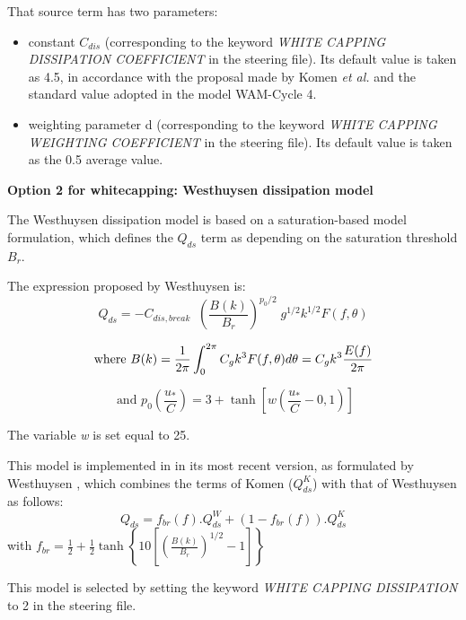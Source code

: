 That source term has two parameters:

\begin{itemize}
\item  constant $C_{dis}$ (corresponding to the keyword \textit{WHITE CAPPING DISSIPATION COEFFICIENT }in the steering file). Its default value is taken as 4.5, in accordance with the proposal made by Komen \textit{et al.} \cite{Komen1984} and the standard value adopted in the model WAM-Cycle 4.
\item  weighting parameter d (corresponding to the keyword \textit{WHITE CAPPING WEIGHTING COEFFICIENT} in the steering file). Its default value is taken as the 0.5 average value.
\end{itemize}

{\bf  Option 2 for whitecapping: Westhuysen dissipation model}

 The Westhuysen dissipation model \cite{Westhuys2007} is based on a saturation-based model formulation, which defines the ${Q}_{ds}$ term as depending on the saturation threshold ${B}_{r}$.

 The expression proposed by Westhuysen is:
\begin{equation} \label{GrindEQ__4_40_}
Q_{ds} =-C_{dis,break} \; \; \left(\frac{B(k)}{B_{r} } \right)^{p_{0} /2} \; g^{1/2} k^{1/2} F(f,\theta )
\end{equation}

$$\mbox{where }\displaystyle B(k)=\frac{1}{2\pi } \int _{0}^{2\pi }C_{g} k^{3} F(f,\theta )d\theta  =C_{g} k^{3} \frac{E(f)}{2\pi } $$

$$\mbox{ and }p_{0} \left(\frac{u_{*} }{C} \right)=3+\tanh \left[w\left(\frac{u_{*} }{C} -0,1\right)\right]$$

 The variable \textit{w} is set equal to 25.

 This model is implemented in \tomawac in its most recent version, as formulated by Westhuysen \cite{Westhuys2008}, which combines the terms of Komen \cite{Komen1984} ($Q_{ds}^{K}$) with that of Westhuysen \cite{Westhuys2007} as follows:
\begin{equation} \label{GrindEQ__4_41_}
Q_{ds} =f_{br} (f).Q_{ds} ^{W} +\left(1-f_{br} (f)\right).Q_{ds} ^{K}
\end{equation}
with $f_{br} =\frac{1}{2} +\frac{1}{2} \tanh \left\{10\left[\left(\frac{B(k)}{B_{r} } \right)^{1/2} -1\right]\right\}$

 This model is selected by setting the keyword \textit{WHITE CAPPING DISSIPATION} to 2 in the steering file.\textbf{}

